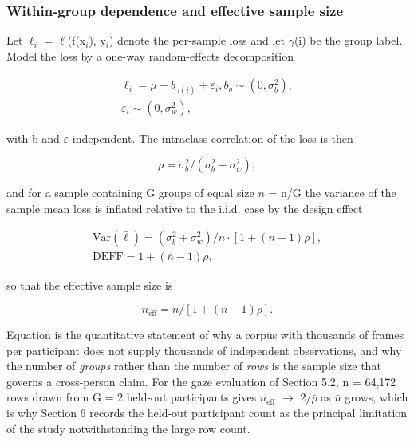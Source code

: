 \subsubsection{Within-group dependence and effective sample size}

Let $\ell_{i}$ = $\ell$(f(x$_{i}$), y$_{i}$) denote the per-sample loss and let $\gamma$(i) be the group label. Model the loss by a one-way random-effects decomposition

\begin{equation}
\label{eq:7}
\begin{aligned}
\ell _{i} = \mu + b_{\gamma (i)} + \varepsilon _{i}, b_g \sim (0, \sigma _b^{2}), \\
\varepsilon _{i} \sim (0, \sigma _w^{2}),
\end{aligned}
\end{equation}

with b and $\varepsilon$ independent. The intraclass correlation of the loss  is then

\begin{equation}
\label{eq:8}
\rho = \sigma _b^{2} / (\sigma _b^{2} + \sigma _w^{2}),
\end{equation}

and for a sample containing G groups of equal size $\bar{n}$ = n/G the variance of the sample mean loss is inflated relative to the i.i.d. case by the design effect

\begin{equation}
\label{eq:9}
\begin{aligned}
\mathrm{Var}(\bar{\ell }) = (\sigma _b^{2} + \sigma _w^{2})/n \cdot [ 1 + (\bar{n} - 1) \rho ], \\
\mathrm{DEFF} = 1 + (\bar{n} - 1) \rho ,
\end{aligned}
\end{equation}

so that the effective sample size is

\begin{equation}
\label{eq:10}
n_{\mathrm{eff}} = n / [ 1 + (\bar{n} - 1) \rho ].
\end{equation}

Equation  is the quantitative statement of why a corpus with thousands of frames per participant does not supply thousands of independent observations, and why the number of \emph{groups} rather than the number of \emph{rows} is the sample size that governs a cross-person claim. For the gaze evaluation of Section 5.2, n = 64,172 rows drawn from G = 2 held-out participants gives $n_{\mathrm{eff}}$ $\to$ 2/$\bar{\rho }$ as $\bar{n}$ grows, which is why Section 6 records the held-out participant count as the principal limitation of the study notwithstanding the large row count.

